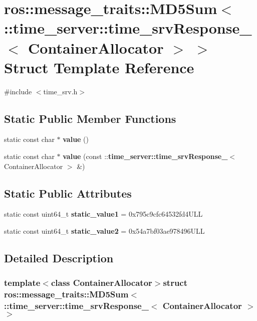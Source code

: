 \section{ros\-:\-:message\-\_\-traits\-:\-:\-M\-D5\-Sum$<$ \-:\-:time\-\_\-server\-:\-:time\-\_\-srv\-Response\-\_\-$<$ \-Container\-Allocator $>$ $>$ \-Struct \-Template \-Reference}
\label{structros_1_1message__traits_1_1MD5Sum_3_01_1_1time__server_1_1time__srvResponse___3_01ContainerAllocator_01_4_01_4}


{\ttfamily \#include $<$time\-\_\-srv.\-h$>$}

\subsection*{\-Static \-Public \-Member \-Functions}
\begin{DoxyCompactItemize}
\item 
static const char $\ast$ {\bf value} ()
\item 
static const char $\ast$ {\bf value} (const \-::{\bf time\-\_\-server\-::time\-\_\-srv\-Response\-\_\-}$<$ \-Container\-Allocator $>$ \&)
\end{DoxyCompactItemize}
\subsection*{\-Static \-Public \-Attributes}
\begin{DoxyCompactItemize}
\item 
static const uint64\-\_\-t {\bf static\-\_\-value1} = 0x795c9cfc64532fd4\-U\-L\-L
\item 
static const uint64\-\_\-t {\bf static\-\_\-value2} = 0x54a7bf03ae978496\-U\-L\-L
\end{DoxyCompactItemize}


\subsection{\-Detailed \-Description}
\subsubsection*{template$<$class Container\-Allocator$>$struct ros\-::message\-\_\-traits\-::\-M\-D5\-Sum$<$ \-::time\-\_\-server\-::time\-\_\-srv\-Response\-\_\-$<$ Container\-Allocator $>$ $>$}



